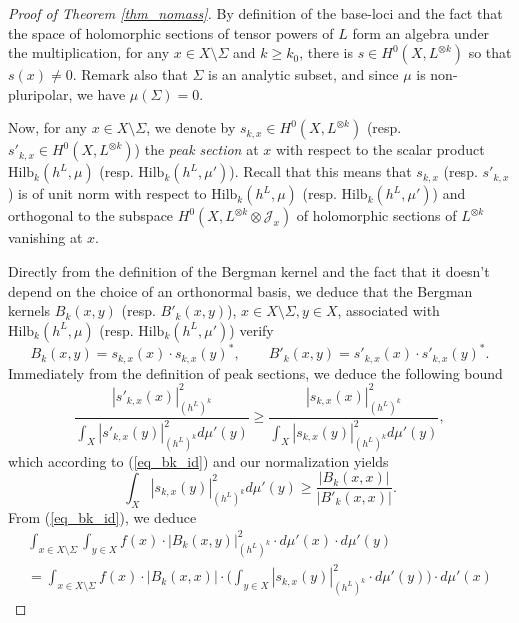 \documentclass[12pt]{article}
\numberwithin{equation}{section}
\theoremstyle{theorem}
\theoremstyle{definition}
\theoremstyle{remark}
\begin{document}
\begin{proof}[Proof of Theorem \ref{thm_nomass}]
		By definition of the base-loci and the fact that the space of holomorphic sections of tensor powers of $L$ form an algebra under the multiplication, for any $x \in X \setminus \Sigma$ and $k \geq k_0$, there is $s \in H^0(X, L^{\otimes k})$ so that $s(x) \neq 0$.
		Remark also that $\Sigma$ is an analytic subset, and since $\mu$ is non-pluripolar, we have $\mu(\Sigma) = 0$.
		\par 
		Now, for any $x \in X \setminus \Sigma$, we denote by $s_{k, x} \in H^0(X, L^{\otimes k})$ (resp. $s'_{k, x} \in H^0(X, L^{\otimes k})$) the \textit{peak section} at $x$ with respect to the scalar product ${\textrm{Hilb}}_k(h^L, \mu)$ (resp. ${\textrm{Hilb}}_k(h^L, \mu')$).
		Recall that this means that $s_{k, x}$ (resp. $s'_{k, x}$) is of unit norm with respect to ${\textrm{Hilb}}_k(h^L, \mu)$ (resp. ${\textrm{Hilb}}_k(h^L, \mu')$) and orthogonal to the subspace $H^0(X, L^{\otimes k} \otimes \mathcal{J}_x)$ of holomorphic sections of $L^{\otimes k}$ vanishing at $x$.
		\par 
		Directly from the definition of the Bergman kernel and the fact that it doesn't depend on the choice of an orthonormal basis, we deduce that the Bergman kernels $B_k(x, y)$ (resp. $B'_k(x, y)$), $x \in X \setminus \Sigma, y \in X$, associated with ${\textrm{Hilb}}_k(h^L, \mu)$ (resp. ${\textrm{Hilb}}_k(h^L, \mu')$) verify
		\begin{equation}\label{eq_bk_id}
			B_k(x, y) = s_{k, x}(x) \cdot s_{k, x}(y)^*, \qquad B'_k(x, y) = s'_{k, x}(x) \cdot s'_{k, x}(y)^*.
		\end{equation}
		Immediately from the definition of peak sections, we deduce the following bound
		\begin{equation}\label{eq_peak_char}
			\frac{|s'_{k, x}(x)|^2_{(h^L)^k}}{\int_X |s'_{k, x}(y)|^2_{(h^L)^k} d \mu'(y)}
			\geq
			\frac{|s_{k, x}(x)|^2_{(h^L)^k}}{\int_X |s_{k, x}(y)|^2_{(h^L)^k} d \mu'(y)},
		\end{equation}
		which according to (\ref{eq_bk_id}) and our normalization yields
		\begin{equation}\label{eq_peak_char1}
			\int_X |s_{k, x}(y)|^2_{(h^L)^k} d \mu'(y)
			\geq
			\frac{|B_k(x, x)|}{|B'_k(x, x)|}.
		\end{equation}
		From (\ref{eq_bk_id}), we deduce
		\begin{multline}\label{eq_int_bk_peak}
			\int_{x \in X \setminus \Sigma} \int_{y \in X} f(x) \cdot |B_k(x, y)|^{2}_{(h^L)^k} \cdot d \mu'(x) \cdot d \mu'(y)
			\\
			=
			\int_{x \in X \setminus \Sigma} f(x) \cdot |B_k(x, x)| \cdot \Big( \int_{y \in X} |s_{k, x}(y)|^2_{(h^L)^k} \cdot d \mu'(y) \Big) \cdot d \mu'(x)

\end{multline}
\end{proof}
\end{document}
